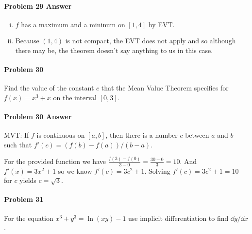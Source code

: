 \documentclass[a4paper, 11pt]{article}
\begin{document}

\paragraph{Problem 29 Answer}
\begin{enumerate}[(i)]
	\item $f$ has a maximum and a mininum on $[1,4]$ by EVT.
	\item Because $(1,4)$ is not compact, the EVT does not apply and so although there may be, the theorem doesn't say anything to us in this case.
\end{enumerate}


\paragraph{Problem 30}
Find the value of the constant $c$ that the Mean Value Theorem specifies for $f(x)=x^3 + x$ on the interval $[0,3]$.


\paragraph{Problem 30 Answer}
MVT: If $f$ is continuous on $[a,b]$, then there is a number $c$ between $a$ and $b$ such that $f'(c) = (f(b)-f(a))/(b-a)$.

For the provided function we have $\frac{f(3)-f(0)}{3-0} = \frac{30-0}{3} = 10$.
And $f'(x) = 3x^2 + 1$ so we know $f'(c) = 3c^2 + 1$.
Solving $f'(c)=3c^2 + 1 = 10$ for $c$ yields $c = \sqrt{3}$.


\paragraph{Problem 31}
For the equation $x^3 + y^3 = \ln(xy) - 1$ use implicit differentiation to find $\dd y/ \dd x$.

\end{document}

